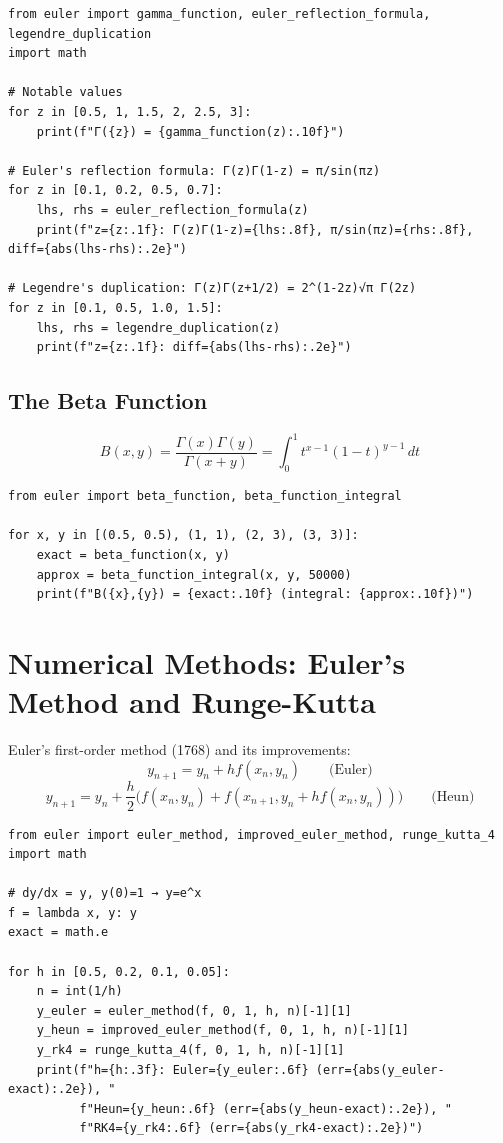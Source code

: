 \documentclass[11pt,a4paper]{article}
\theoremstyle{definition}
\begin{document}
\begin{lstlisting}[caption={Gamma function and reflection}, label=lst:gamma]
from euler import gamma_function, euler_reflection_formula, legendre_duplication
import math

# Notable values
for z in [0.5, 1, 1.5, 2, 2.5, 3]:
    print(f"Γ({z}) = {gamma_function(z):.10f}")

# Euler's reflection formula: Γ(z)Γ(1-z) = π/sin(πz)
for z in [0.1, 0.2, 0.5, 0.7]:
    lhs, rhs = euler_reflection_formula(z)
    print(f"z={z:.1f}: Γ(z)Γ(1-z)={lhs:.8f}, π/sin(πz)={rhs:.8f}, diff={abs(lhs-rhs):.2e}")

# Legendre's duplication: Γ(z)Γ(z+1/2) = 2^(1-2z)√π Γ(2z)
for z in [0.1, 0.5, 1.0, 1.5]:
    lhs, rhs = legendre_duplication(z)
    print(f"z={z:.1f}: diff={abs(lhs-rhs):.2e}")
\end{lstlisting}

\subsection{The Beta Function}
\[
B(x,y) = \frac{\Gamma(x)\Gamma(y)}{\Gamma(x+y)} = \int_0^1 t^{x-1}(1-t)^{y-1}\, dt
\]

\begin{lstlisting}[caption={Beta function}, label=lst:beta]
from euler import beta_function, beta_function_integral

for x, y in [(0.5, 0.5), (1, 1), (2, 3), (3, 3)]:
    exact = beta_function(x, y)
    approx = beta_function_integral(x, y, 50000)
    print(f"B({x},{y}) = {exact:.10f} (integral: {approx:.10f})")
\end{lstlisting}

\section{Numerical Methods: Euler's Method and Runge-Kutta}
\label{sec:numerical}

Euler's first-order method (1768) \cite{euler1768} and its improvements:
\[
y_{n+1} = y_n + h f(x_n, y_n) \qquad \text{(Euler)}
\]
\[
y_{n+1} = y_n + \frac{h}{2}\bigl(f(x_n, y_n) + f(x_{n+1}, y_n + h f(x_n, y_n))\bigr) \qquad \text{(Heun)}
\]

\begin{lstlisting}[caption={ODE solvers}, label=lst:ode]
from euler import euler_method, improved_euler_method, runge_kutta_4
import math

# dy/dx = y, y(0)=1 → y=e^x
f = lambda x, y: y
exact = math.e

for h in [0.5, 0.2, 0.1, 0.05]:
    n = int(1/h)
    y_euler = euler_method(f, 0, 1, h, n)[-1][1]
    y_heun = improved_euler_method(f, 0, 1, h, n)[-1][1]
    y_rk4 = runge_kutta_4(f, 0, 1, h, n)[-1][1]
    print(f"h={h:.3f}: Euler={y_euler:.6f} (err={abs(y_euler-exact):.2e}), "
          f"Heun={y_heun:.6f} (err={abs(y_heun-exact):.2e}), "
          f"RK4={y_rk4:.6f} (err={abs(y_rk4-exact):.2e})")
\end{lstlisting}
\end{document}
